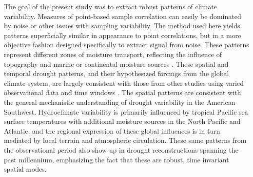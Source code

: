 \documentclass[10pt]{iopart}
\begin{document}
The goal of the present study was to extract robust patterns of climate variability. Measures of point-based sample correlation can easily be dominated by noise or other issues with sampling variability. The method used here yields patterns superficially similar in appearance to point correlations, but in a more objective fashion designed specifically to extract signal from noise. These patterns represent different zones of moisture transport, reflecting the influence of topography and marine or continental moisture sources \parencite{Liu2010, Hu2011}. These spatial and temporal drought patterns, and their hypothesized forcings from the global climate system, are largely consistent with those from other studies using varied observational data and time windows \parencite{Comrie1999,Cook1999,McCabe1999,McCabe2004,Ryu2010,Seager2014,Herrmann2016}. The spatial patterns are consistent with the general mechanistic understanding of drought variability in the American Southwest. Hydroclimate variability is primarily influenced by tropical Pacific sea surface temperatures with additional moisture sources in the North Pacific and Atlantic, and the regional expression of these global influences is in turn mediated by local terrain and atmospheric circulation. These same patterns from the observational period also show up in drought reconstructions spanning the past millennium, emphasizing the fact that these are robust, time invariant spatial modes.
\end{document}
